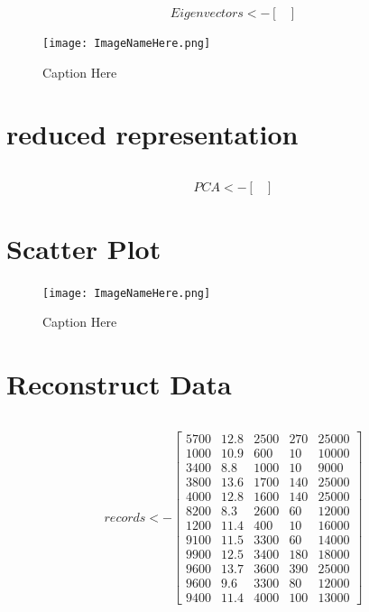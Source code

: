 \documentclass{report}
\begin{document}
\[
  Eigenvectors <- 
  \begin{bmatrix}
  \end{bmatrix}
\]

\begin{figure}[H]
  \texttt{[image: ImageNameHere.png]}
  \caption{Caption Here}
  \label{fig:LabelHere}
\end{figure}

\section{reduced representation}

\begin{verbatim}	
\end{verbatim}

\[
  PCA <- 
  \begin{bmatrix}
  \end{bmatrix}
\]

\section{Scatter Plot}

\begin{figure}[H]
  \texttt{[image: ImageNameHere.png]}
  \caption{Caption Here}
  \label{fig:LabelHere}
\end{figure}

\section{Reconstruct Data}

\begin{verbatim}	
\end{verbatim}

\[
  records <- 
  \begin{bmatrix}
    5700 & 12.8 & 2500 & 270 & 25000 \\
    1000 & 10.9 & 600 & 10 & 10000 \\
    3400 & 8.8 & 1000 & 10 & 9000 \\
    3800 & 13.6 & 1700 & 140 & 25000 \\
    4000 & 12.8 & 1600 & 140 & 25000 \\
    8200 & 8.3 & 2600 & 60 & 12000 \\
    1200 & 11.4 & 400 & 10 & 16000 \\
    9100 & 11.5 & 3300 & 60 & 14000 \\
    9900 & 12.5 & 3400 & 180 & 18000 \\
    9600 & 13.7 & 3600 & 390 & 25000 \\
    9600 & 9.6 & 3300 & 80 & 12000 \\
    9400 & 11.4 & 4000 & 100 & 13000
  \end{bmatrix}
\]
\end{document}
